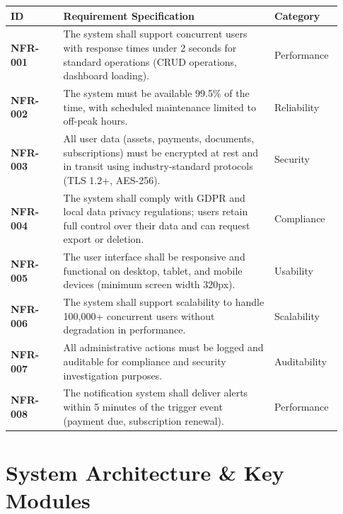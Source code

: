 \documentclass[11pt, a4paper]{article}
\newcommand{\reqid}[1]{\textbf{\color{PrimaryColor}#1}}
\begin{document}
	\small
	\begin{center}
		\renewcommand{\arraystretch}{1.4}
		\begin{tabular}{p{0.15\linewidth} p{0.6\linewidth} p{0.18\linewidth}}
			\toprule
			\textbf{ID} & \textbf{Requirement Specification} & \textbf{Category} \\
			\midrule
			\reqid{NFR-001} & The system shall support concurrent users with response times under 2 seconds for standard operations (CRUD operations, dashboard loading). & Performance \\
			\reqid{NFR-002} & The system must be available 99.5\% of the time, with scheduled maintenance limited to off-peak hours. & Reliability \\
			\reqid{NFR-003} & All user data (assets, payments, documents, subscriptions) must be encrypted at rest and in transit using industry-standard protocols (TLS 1.2+, AES-256). & Security \\
			\reqid{NFR-004} & The system shall comply with GDPR and local data privacy regulations; users retain full control over their data and can request export or deletion. & Compliance \\
			\reqid{NFR-005} & The user interface shall be responsive and functional on desktop, tablet, and mobile devices (minimum screen width 320px). & Usability \\
			\reqid{NFR-006} & The system shall support scalability to handle 100,000+ concurrent users without degradation in performance. & Scalability \\
			\reqid{NFR-007} & All administrative actions must be logged and auditable for compliance and security investigation purposes. & Auditability \\
			\reqid{NFR-008} & The notification system shall deliver alerts within 5 minutes of the trigger event (payment due, subscription renewal). & Performance \\
			\bottomrule
		\end{tabular}
	\end{center}
	\normalsize
	
	
	\section{System Architecture \& Key Modules}
	
\end{document}
